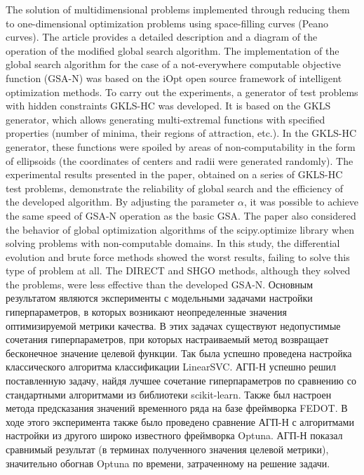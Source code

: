 \documentclass[a4paper,12pt,russian]{article}
\begin{document}
\begin{small}
The solution of multidimensional problems implemented through reducing them to one-dimensional optimization problems using space-filling curves (Peano curves).
The article provides a detailed description and a diagram of the operation of the modified global search algorithm.
The implementation of the global search algorithm for the case of a not-everywhere computable objective function (GSA-N) was based on the iOpt open source framework of intelligent optimization methods.
To carry out the experiments, a generator of test problems with hidden constraints GKLS-HC was developed. It is based on the GKLS generator, which allows generating multi-extremal functions with specified properties (number of minima, their regions of attraction, etc.). In the GKLS-HC generator, these functions were spoiled by areas of non-computability in the form of ellipsoids (the coordinates of centers and radii were generated randomly).
The experimental results presented in the paper, obtained on a series of GKLS-HC test problems, demonstrate the reliability of global search and the efficiency of the developed algorithm. By adjusting the parameter $\alpha$, it was possible to achieve the same speed of GSA-N operation as the basic GSA.
The paper also considered the behavior of global optimization algorithms of the scipy.optimize library when solving problems with non-computable domains. In this study, the differential evolution and brute force methods showed the worst results, failing to solve this type of problem at all. The DIRECT and SHGO methods, although they solved the problems, were less effective than the developed GSA-N.
Основным результатом являются эксперименты с модельными задачами настройки гиперпараметров, в которых возникают неопределенные значения оптимизируемой метрики качества. В этих задачах существуют недопустимые сочетания гиперпараметров, при которых настраиваемый метод возвращает бесконечное значение целевой функции.
Так была успешно проведена настройка классического алгоритма классификации LinearSVC. АГП-Н успешно решил поставленную задачу, найдя лучшее сочетание гиперпараметров по сравнению со стандартными алгоритмами из библиотеки scikit-learn.
Также был настроен метода предсказания значений временного ряда на базе фреймворка FEDOT. В ходе этого эксперимента также было проведено сравнение АГП-Н с алгоритмами настройки из другого широко известного фреймворка Optuna. АГП-Н показал сравнимый результат (в терминах полученного значения целевой метрики), значительно обогнав Optuna по времени, затраченному на решение задачи.


\end{small}
\end{document}
